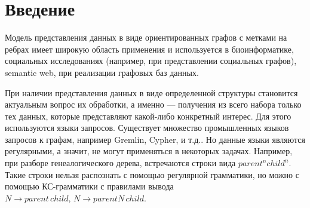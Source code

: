 \documentclass[14pt]{matmex-diploma-custom}
\begin{document}
\maketitle
\tableofcontents

\section*{Введение}
	Модель представления данных в виде ориентированных графов с метками на ребрах имеет широкую область применения и используется в биоинформатике, социальных исследованиях (например, при представлении социальных графов), semantic web, при реализации графовых баз данных. 
	
	При наличии представления данных в виде определенной структуры становится актуальным вопрос их обработки, а именно --- получения из всего набора только тех данных, которые представляют какой-либо конкретный интерес. Для этого используются языки запросов. Существует множество промышленных языков запросов к графам, например Gremlin\cite{Gremlin}, Cypher\cite{Cypher}, и т.д.. Но данные языки являются регулярными, а значит, не могут применяться в некоторых задачах. Например, при разборе генеалогического дерева, встречаются строки вида \(parent^nchild^n\). Такие строки нельзя распознать с помощью регулярной грамматики, но можно с помощью КС-грамматики с правилами вывода \(N \to parent\,child, \,N \to parentN\, child\). 
	
\end{document}
